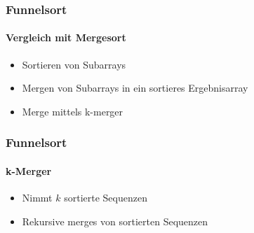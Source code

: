 \documentclass{beamer}
\begin{document}
\begin{frame}
  \frametitle{Funnelsort}
  \framesubtitle{Vergleich mit Mergesort}
  \begin{itemize}
    \item Sortieren von Subarrays
    \item Mergen von Subarrays in ein sortieres Ergebnisarray
  \end{itemize}
  \begin{itemize}
    \item Merge mittels k-merger
  \end{itemize}
\end{frame}

\begin{frame}
  \frametitle{Funnelsort}
  \framesubtitle{k-Merger}
  \begin{itemize}
    \item Nimmt $k$ sortierte Sequenzen
    \item Rekursive merges von sortierten Sequenzen
  \end{itemize}
\end{frame}
\end{document}
